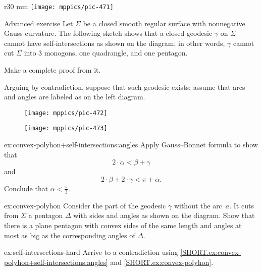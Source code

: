 \begin{wrapfigure}{r}{30 mm}
\vskip4mm
\centering
\texttt{[image: mppics/pic-471]}
\end{wrapfigure}

\begin{thm}{Advanced exercise}\label{ex:convex-polyhon+self-intersections}
Let $\Sigma$ be a closed smooth regular surface with nonnegative Gauss curvature.
The following sketch shows that a closed geodesic $\gamma$ on $\Sigma$ cannot have self-intersections as shown on the diagram;
in other words, $\gamma$ cannot cut $\Sigma$ into 3 monogons, one quadrangle, and one pentagon. 

Make a complete proof from it.

Arguing by contradiction, suppose that such geodesic exists;
assume that arcs and angles are labeled as on the left diagram.

\begin{figure}[h!]
\begin{minipage}{.38\textwidth}
\centering
\texttt{[image: mppics/pic-472]}
\end{minipage}\hfill
\begin{minipage}{.58\textwidth}
\centering
\texttt{[image: mppics/pic-473]}
\end{minipage}
\end{figure}

\begin{subthm}{ex:convex-polyhon+self-intersections:angles}
Apply Gauss--Bonnet formula to show that
\[2\cdot\alpha<\beta+\gamma\]
and 
\[2\cdot\beta+2\cdot \gamma<\pi+\alpha.\]
Conclude that $\alpha <\tfrac \pi 3$.
\end{subthm}

\begin{subthm}{ex:convex-polyhon}
Consider the part of the geodesic $\gamma$ without the arc~$a$.
It cuts from $\Sigma$ a pentagon $\Delta$ with sides and angles as shown on the diagram. 
Show that there is a plane pentagon with convex sides of the same length and angles at most as big as the corresponding angles of $\Delta$.
\end{subthm}

\begin{subthm}{ex:self-intersections-hard}
Arrive to a contradiction using \ref{SHORT.ex:convex-polyhon+self-intersections:angles} and \ref{SHORT.ex:convex-polyhon}. 
\end{subthm}

\end{thm}

